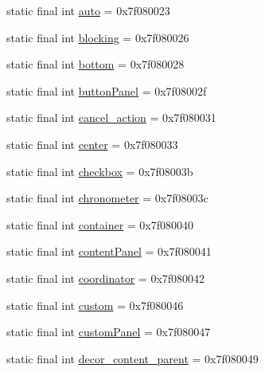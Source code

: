 \begin{DoxyCompactItemize}
static final int \mbox{\hyperlink{classandroid_1_1support_1_1design_1_1R_1_1id_a425fdc3ba2fac6cb061ce14b2a605caf}{auto}} = 0x7f080023
\item 
static final int \mbox{\hyperlink{classandroid_1_1support_1_1design_1_1R_1_1id_a6505e8df123ea2e548a5d6ea4ff3c461}{blocking}} = 0x7f080026
\item 
static final int \mbox{\hyperlink{classandroid_1_1support_1_1design_1_1R_1_1id_a79e61e6085c198377d3f88b7fd07fd77}{bottom}} = 0x7f080028
\item 
static final int \mbox{\hyperlink{classandroid_1_1support_1_1design_1_1R_1_1id_acf364991cf5b4d5eab5726ffc663b9fe}{button\+Panel}} = 0x7f08002f
\item 
static final int \mbox{\hyperlink{classandroid_1_1support_1_1design_1_1R_1_1id_a846a5d8adf38692244186015845064be}{cancel\+\_\+action}} = 0x7f080031
\item 
static final int \mbox{\hyperlink{classandroid_1_1support_1_1design_1_1R_1_1id_a8200e2d654b985ad1e81630039ed9c77}{center}} = 0x7f080033
\item 
static final int \mbox{\hyperlink{classandroid_1_1support_1_1design_1_1R_1_1id_a83a2c2d0d9633468d1c4eae1e4e3c866}{checkbox}} = 0x7f08003b
\item 
static final int \mbox{\hyperlink{classandroid_1_1support_1_1design_1_1R_1_1id_ae85ae29fcbf218c6cc3f47c33466f9e5}{chronometer}} = 0x7f08003c
\item 
static final int \mbox{\hyperlink{classandroid_1_1support_1_1design_1_1R_1_1id_afb9511dea6949b04c835cccea1724f2d}{container}} = 0x7f080040
\item 
static final int \mbox{\hyperlink{classandroid_1_1support_1_1design_1_1R_1_1id_af8147990137f41589ca326c6cffc4243}{content\+Panel}} = 0x7f080041
\item 
static final int \mbox{\hyperlink{classandroid_1_1support_1_1design_1_1R_1_1id_a2b62305c4c2ed96abd7f329cd9cedd65}{coordinator}} = 0x7f080042
\item 
static final int \mbox{\hyperlink{classandroid_1_1support_1_1design_1_1R_1_1id_a5e6da517eb0f33a54612c6496f88ba82}{custom}} = 0x7f080046
\item 
static final int \mbox{\hyperlink{classandroid_1_1support_1_1design_1_1R_1_1id_ae72fd9603fa648f454993b341554eb57}{custom\+Panel}} = 0x7f080047
\item 
static final int \mbox{\hyperlink{classandroid_1_1support_1_1design_1_1R_1_1id_a7a500f63633e64805d62d6c01d124d47}{decor\+\_\+content\+\_\+parent}} = 0x7f080049
\item 

\end{DoxyCompactItemize}

